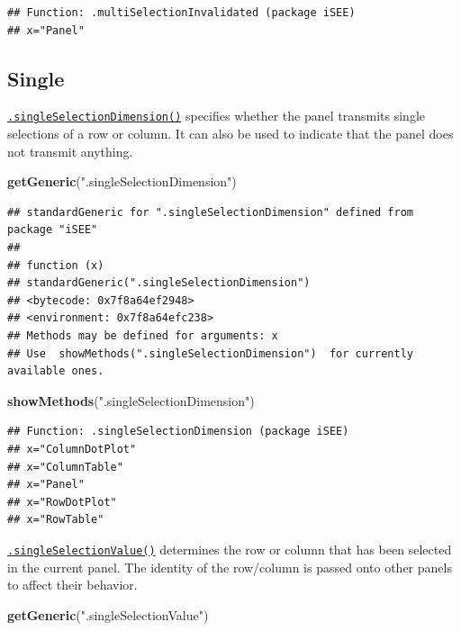\documentclass[
]{book}
\newenvironment{Shaded}{\begin{snugshade}}{\end{snugshade}}
\newcommand{\KeywordTok}[1]{\textcolor[rgb]{0.13,0.29,0.53}{\textbf{#1}}}
\newcommand{\NormalTok}[1]{#1}
\newcommand{\StringTok}[1]{\textcolor[rgb]{0.31,0.60,0.02}{#1}}
\begin{document}
\begin{verbatim}
## Function: .multiSelectionInvalidated (package iSEE)
## x="Panel"
\end{verbatim}

\hypertarget{single}{%
\subsection{Single}\label{single}}

\href{https://isee.github.io/iSEE/reference/single-select-generics.html}{\texttt{.singleSelectionDimension()}} specifies whether the panel transmits single selections of a row or column.
It can also be used to indicate that the panel does not transmit anything.

\begin{Shaded}
\begin{Highlighting}[]
\KeywordTok{getGeneric}\NormalTok{(}\StringTok{".singleSelectionDimension"}\NormalTok{)}
\end{Highlighting}
\end{Shaded}

\begin{verbatim}
## standardGeneric for ".singleSelectionDimension" defined from package "iSEE"
## 
## function (x) 
## standardGeneric(".singleSelectionDimension")
## <bytecode: 0x7f8a64ef2948>
## <environment: 0x7f8a64efc238>
## Methods may be defined for arguments: x
## Use  showMethods(".singleSelectionDimension")  for currently available ones.
\end{verbatim}

\begin{Shaded}
\begin{Highlighting}[]
\KeywordTok{showMethods}\NormalTok{(}\StringTok{".singleSelectionDimension"}\NormalTok{)}
\end{Highlighting}
\end{Shaded}

\begin{verbatim}
## Function: .singleSelectionDimension (package iSEE)
## x="ColumnDotPlot"
## x="ColumnTable"
## x="Panel"
## x="RowDotPlot"
## x="RowTable"
\end{verbatim}

\href{https://isee.github.io/iSEE/reference/single-select-generics.html}{\texttt{.singleSelectionValue()}} determines the row or column that has been selected in the current panel.
The identity of the row/column is passed onto other panels to affect their behavior.

\begin{Shaded}
\begin{Highlighting}[]
\KeywordTok{getGeneric}\NormalTok{(}\StringTok{".singleSelectionValue"}\NormalTok{)}
\end{Highlighting}
\end{Shaded}
\end{document}
